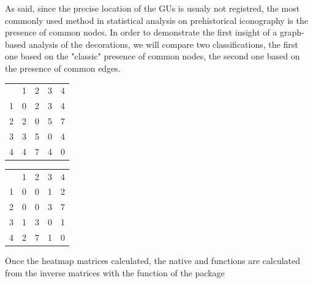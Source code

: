 \documentclass[article]{jss}\usepackage{knitr}
\begin{document}
As said, since the precise location of the GUs is usualy not registred, the most commonly used method in statistical analysis on prehistorical iconography is the presence of common nodes. In order to demonstrate the first insight of a graph-based analysis of the decorations, we will compare two classifications, the first one based on the "classic" presence of common nodes, the second one based on the presence of common edges.

\begin{table}[H]
\begin{minipage}{.45\textwidth}
\centering
\begin{tabular}{rrrrr}
  & 1 & 2 & 3 & 4 \\ 
 1 & 0 & 2 & 3 & 4 \\ 
  2 & 2 & 0 & 5 & 7 \\ 
  3 & 3 & 5 & 0 & 4 \\ 
  4 & 4 & 7 & 4 & 0 \\ 
  \end{tabular}

\end{minipage}
\begin{minipage}{.45\textwidth}
\centering
\begin{tabular}{rrrrr}
  & 1 & 2 & 3 & 4 \\ 
 1 & 0 & 0 & 1 & 2 \\ 
  2 & 0 & 0 & 3 & 7 \\ 
  3 & 1 & 3 & 0 & 1 \\ 
  4 & 2 & 7 & 1 & 0 \\ 
  \end{tabular}

\end{minipage}
\end{table}

Once the heatmap matrices calculated, the native  and  functions \citep{R19} are calculated from the inverse matrices with the function  of the  package \citep{Friendly20}
\end{document}
